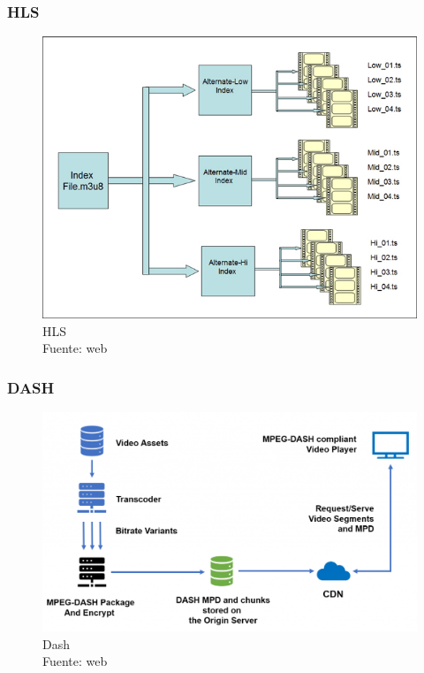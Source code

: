 \subsubsection{HLS}
\begin{figure}[H]
    \begin{center}
        \includegraphics[width=12cm]{img/capitulo_2/hls.jpg}
    \end{center}
    \caption{HLS\\Fuente: web}
    \label{fig:classical_ml}
\end{figure}

\subsubsection{DASH}
\begin{figure}[H]
    \begin{center}
        \includegraphics[width=12cm]{img/capitulo_2/dash.png}
    \end{center}
    \caption{Dash\\Fuente: web}
    \label{fig:classical_ml}
\end{figure}


